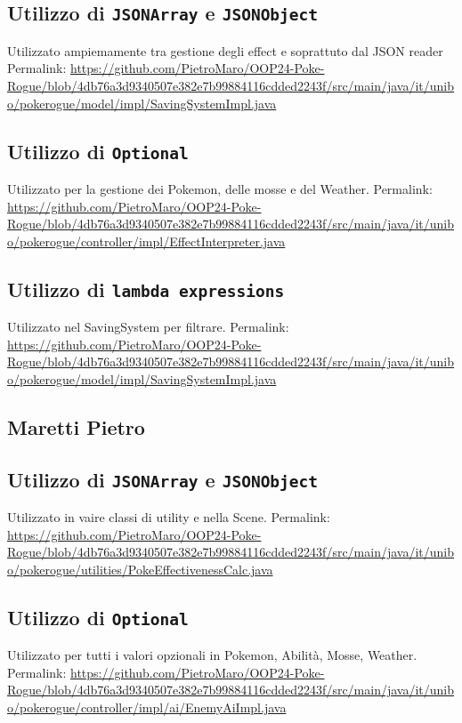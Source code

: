 \documentclass[a4paper,12pt]{report}
\begin{document}
{{\subsection*{Utilizzo di \texttt{JSONArray} e \texttt{JSONObject}}
Utilizzato ampiemamente tra gestione degli effect e soprattuto dal JSON reader
Permalink: \url{https://github.com/PietroMaro/OOP24-Poke-Rogue/blob/4db76a3d9340507e382e7b99884116cdded2243f/src/main/java/it/unibo/pokerogue/model/impl/SavingSystemImpl.java}

\subsection*{Utilizzo di \texttt{Optional}}
Utilizzato per la gestione dei Pokemon, delle mosse e del Weather.
Permalink: \url{https://github.com/PietroMaro/OOP24-Poke-Rogue/blob/4db76a3d9340507e382e7b99884116cdded2243f/src/main/java/it/unibo/pokerogue/controller/impl/EffectInterpreter.java}


\subsection*{Utilizzo di \texttt{lambda expressions}}
Utilizzato nel SavingSystem per filtrare. Permalink: 
\url{https://github.com/PietroMaro/OOP24-Poke-Rogue/blob/4db76a3d9340507e382e7b99884116cdded2243f/src/main/java/it/unibo/pokerogue/model/impl/SavingSystemImpl.java}


\subsection{Maretti Pietro}

\subsection*{Utilizzo di \texttt{JSONArray} e \texttt{JSONObject}}
Utilizzato in vaire classi di utility e nella Scene. Permalink: \url{https://github.com/PietroMaro/OOP24-Poke-Rogue/blob/4db76a3d9340507e382e7b99884116cdded2243f/src/main/java/it/unibo/pokerogue/utilities/PokeEffectivenessCalc.java}

\subsection*{Utilizzo di \texttt{Optional}}
Utilizzato per tutti i valori opzionali in Pokemon, Abilità, Mosse, Weather.
Permalink: \url{https://github.com/PietroMaro/OOP24-Poke-Rogue/blob/4db76a3d9340507e382e7b99884116cdded2243f/src/main/java/it/unibo/pokerogue/controller/impl/ai/EnemyAiImpl.java}




}}
\end{document}
